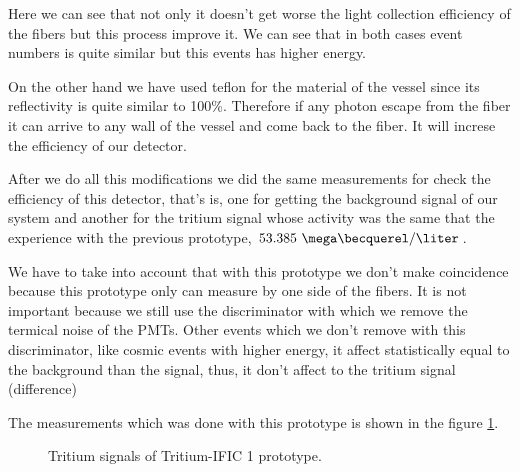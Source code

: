 Here we can see that not only it doesn't get worse the light collection efficiency of the fibers but this process improve it. We can see that in both cases event numbers is quite similar but this events has higher energy.

On the other hand we have used teflon for the material of the vessel since its reflectivity is quite similar to 100\%. Therefore if any  photon escape from the fiber it can arrive to any wall of the vessel and come back to the fiber. It will increse the efficiency of our detector.

After we do all this modifications we did the same measurements for check the efficiency of this detector, that's is, one for getting the background signal of our system and another for the tritium signal whose activity was the same that the experience with the previous prototype, $53.385~\mega\becquerel/\liter$. 

We have to take into account that with this prototype we don't make coincidence because this prototype only can measure by one side of the fibers. It is not important because we still use the discriminator with which we remove the termical noise of the PMTs. Other events which we don't remove with this discriminator, like cosmic events with higher energy, it affect statistically equal to the background than the signal, thus, it don't affect to the tritium signal (difference)

The measurements which was done with  this prototype is shown in the figure \ref{fig:Tritium_IFIC_1_Signals}.

\begin{figure}[htbp]
\centering
{}
\caption{Tritium signals of Tritium-IFIC 1 prototype.} \label{fig:Tritium_IFIC_1_Signals}
\end{figure}

